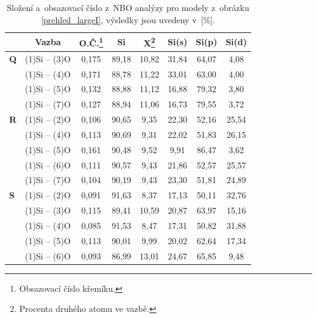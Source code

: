 \documentclass[
digital, %
table,   %
nolof,     %
nolot,     %
oneside,
]{fithesis3}
\begin{document}
\begin{table}[H]
\caption{Složení a~obsazovací číslo z~NBO analýzy pro modely z~obrázku \ref{prehled_largeI}, výsledky jsou uvedeny v~[\%].}
\begin{minipage}{\textwidth}
\begin{center}
\begin{tabular}{|l|c|c|c|c|c|c|c|}
\hline
\label{nbo_largeI}&  Vazba & O.Č.\footnote{Obsazovací číslo křemíku.} & Si & X\footnote{Procenta druhého atomu ve  vazbě.} & Si(s) & Si(p) &Si(d) \\ \hline
\textbf{Q}&  (1)Si -- (3)O   & 0,175 & 89,18   & 10,82   & 31,84   & 64,07   & 4,08   \\ \hline
&  (1)Si -- (4)O  & 0,171 & 88,78   & 11,22   & 33,01   & 63,00   & 4,00   \\ \hline
& (1)Si -- (5)O & 0,132 & 88,88   & 11,12   & 16,88   & 79,32   & 3,80   \\ \hline
& (1)Si -- (7)O & 0,127 & 88,94   & 11,06   & 16,73   & 79,55   & 3,72   \\ \hline
\textbf{R} & (1)Si -- (2)O  & 0,106 & 90,65   & 9,35   & 22,30   & 52,16   & 25,54   \\ \hline
& (1)Si -- (4)O & 0,113 & 90,69   & 9,31   & 22,02   & 51,83   & 26,15   \\ \hline
&  (1)Si -- (5)O  & 0,161 & 90,48   & 9,52   & 9,91   & 86,47   & 3,62   \\ \hline
&  (1)Si -- (6)O & 0,111 & 90,57   & 9,43   & 21,86   & 52,57   & 25,57   \\ \hline
& (1)Si -- (7)O & 0,104 & 90,19   & 9,43   & 23,30   & 51,81   & 24,89   \\ \hline
\textbf{S}&(1)Si -- (2)O  & 0,091 & 91,63   & 8,37   & 17,13   & 50,11   & 32,76   \\ \hline
& (1)Si -- (3)O  & 0,115 & 89,41   & 10,59   & 20,87   & 63,97   & 15,16   \\ \hline
&   (1)Si -- (4)O   & 0,085 & 91,53   & 8,47   & 17,31   & 50,82   & 31,88   \\ \hline
&  (1)Si -- (5)O  & 0,113 & 90,01   & 9,99   & 20,02   & 62,64   & 17,34   \\ \hline
& (1)Si -- (6)O & 0,093 & 86,99   & 13,01   & 24,67   & 65,85   & 9,48   \\ \hline
\end{tabular}\end{center}\end{minipage}\end{table}
\end{document}
